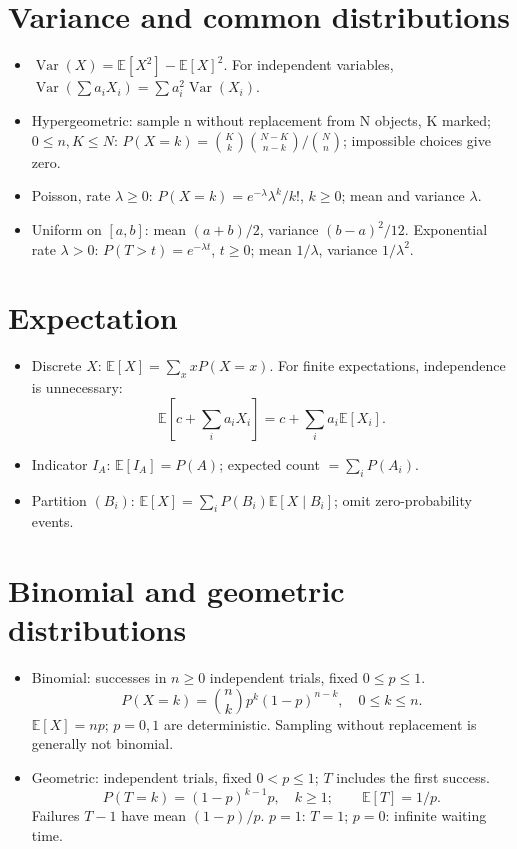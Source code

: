 \section{Variance and common distributions}
\begin{itemize}[nosep,leftmargin=*]
\item $\operatorname{Var}(X)=\mathbb E[X^2]-\mathbb E[X]^2$.
For independent variables, $\operatorname{Var}(\sum a_iX_i)=\sum a_i^2\operatorname{Var}(X_i)$.
\item Hypergeometric: sample n without replacement from N objects, K marked; $0\le n,K\le N$:
$P(X=k)=\binom Kk\binom{N-K}{n-k}/\binom Nn$; impossible choices give zero.
\item Poisson, rate $\lambda\ge0$: $P(X=k)=e^{-\lambda}\lambda^k/k!$,
$k\ge0$; mean and variance $\lambda$.
\item Uniform on $[a,b]$: mean $(a+b)/2$, variance $(b-a)^2/12$.
Exponential rate $\lambda>0$: $P(T>t)=e^{-\lambda t}$, $t\ge0$;
mean $1/\lambda$, variance $1/\lambda^2$.
\end{itemize}

\section{Expectation}
\begin{itemize}[nosep,leftmargin=*]
\item Discrete $X$: $\mathbb E[X]=\sum_x xP(X=x)$.
For finite expectations, independence is unnecessary:
\[
 \mathbb E\!\left[c+\sum_i a_iX_i\right]
 =c+\sum_i a_i\mathbb E[X_i].
\]
\item Indicator $I_A$: $\mathbb E[I_A]=P(A)$;
expected count $=\sum_i P(A_i)$.
\item Partition $(B_i)$:
$\mathbb E[X]=\sum_iP(B_i)\mathbb E[X\mid B_i]$;
omit zero-probability events.
\end{itemize}

\section{Binomial and geometric distributions}
\begin{itemize}[nosep,leftmargin=*]
\item Binomial: successes in $n\ge0$ independent trials,
fixed $0\le p\le1$.
\[
 P(X=k)=\binom nk p^k(1-p)^{n-k},\quad 0\le k\le n.
\]
$\mathbb E[X]=np$; $p=0,1$ are deterministic.
Sampling without replacement is generally not binomial.
\item Geometric: independent trials, fixed $0<p\le1$;
$T$ includes the first success.
\[
 P(T=k)=(1-p)^{k-1}p,\quad k\ge1;\qquad
 \mathbb E[T]=1/p.
\]
Failures $T-1$ have mean $(1-p)/p$.
$p=1$: $T=1$; $p=0$: infinite waiting time.
\end{itemize}

